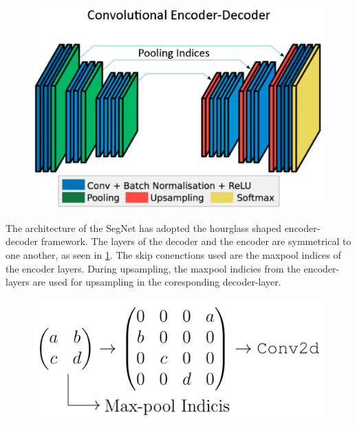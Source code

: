 \documentclass[
]{dtuposter}
\begin{document}
\begin{dtupostercontent}
\begin{figure}
	\centering
	\includegraphics[width=0.8\linewidth]{Structure}
	\caption{}
	\label{fig:Structure}
\end{figure}
The architecture of the SegNet has adopted the hourglass shaped encoder-decoder 
framework. The layers of the decoder and the encoder are symmetrical to one 
another, as seen in \ref{fig:Structure}. The skip conenctions used are the 
maxpool indices of the encoder layers. During upsampling, the maxpool indicies 
from the encoder-layers are used for upsampling in the coresponding 
decoder-layer. 
\begin{figure}
	\centering
	\begin{fadebox}
	\includegraphics[width=1\linewidth]{pool}
	

\end{fadebox}
\end{figure}
\end{dtupostercontent}
\end{document}
